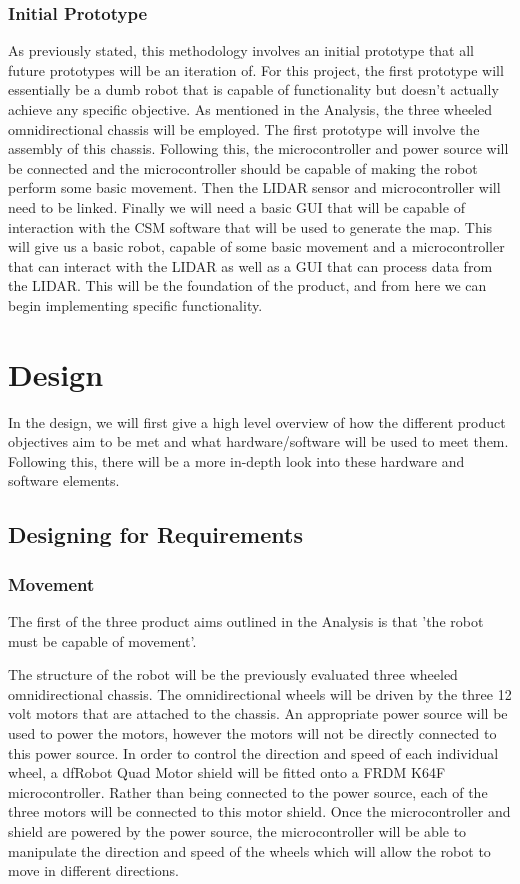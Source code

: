 		\subsection{Initial Prototype}
		As previously stated, this methodology involves an initial prototype that all future prototypes will be an iteration of. For this project, the first prototype will essentially be a dumb robot that is capable of functionality but doesn't actually achieve any specific objective. As mentioned in the Analysis, the three wheeled omnidirectional chassis will be employed. The first prototype will involve the assembly of this chassis. Following this, the microcontroller and power source will be connected and the microcontroller should be capable of making the robot perform some basic movement. Then the LIDAR sensor and microcontroller will need to be linked. Finally we will need a basic GUI that will be capable of interaction with the CSM software that will be used to generate the map. This will give us a basic robot, capable of some basic movement and a microcontroller that can interact with the LIDAR as well as a GUI that can process data from the LIDAR. This will be the foundation of the product, and from here we can begin implementing specific functionality.
	
	\chapter{Design}
	In the design, we will first give a high level overview of how the different product objectives aim to be met and what hardware/software will be used to meet them. Following this, there will be a more in-depth look into these hardware and software elements.
	
	\section{Designing for Requirements}
		\subsection{Movement}
		The first of the three product aims outlined in the Analysis is that 'the robot must be capable of movement'.
			
		The structure of the robot will be the previously evaluated three wheeled omnidirectional chassis. The omnidirectional wheels will be driven by the three 12 volt motors that are attached to the chassis. An appropriate power source will be used to power the motors, however the motors will not be directly connected to this power source. In order to control the direction and speed of each individual wheel, a dfRobot Quad Motor shield will be fitted onto a FRDM K64F microcontroller. Rather than being connected to the power source, each of the three motors will be connected to this motor shield. Once the microcontroller and shield are powered by the power source, the microcontroller will be able to manipulate the direction and speed of the wheels which will allow the robot to move in different directions.
			
